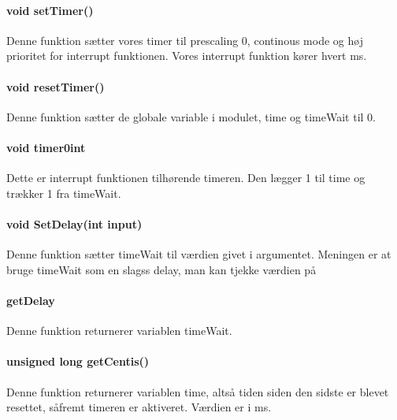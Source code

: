 \paragraph{void setTimer()}
Denne funktion sætter vores timer til prescaling 0, continous mode og høj prioritet for interrupt funktionen. Vores interrupt funktion kører hvert ms.
\paragraph{void resetTimer()}
Denne funktion sætter de globale variable i modulet, time og timeWait til 0.
\paragraph{void timer0int}
Dette er interrupt funktionen tilhørende timeren. Den lægger 1 til time og trækker 1 fra timeWait. 
\paragraph{void SetDelay(int input)}
Denne funktion sætter timeWait til værdien givet i argumentet. Meningen er at bruge timeWait som en slagss delay, man kan tjekke værdien på
\paragraph{getDelay}
Denne funktion returnerer variablen timeWait.
\paragraph{unsigned long getCentis()}
Denne funktion returnerer variablen time, altså tiden siden den sidste er blevet resettet, såfremt timeren er aktiveret. Værdien er i ms.

